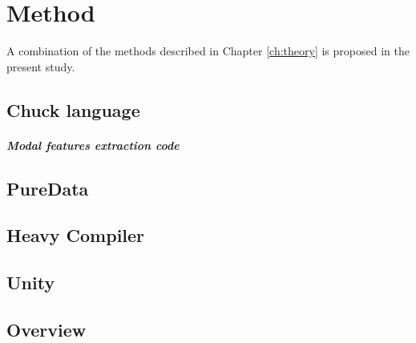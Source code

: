 \chapter{Method}\label{ch:method}
\mbox{}\par
A combination of the methods described in Chapter \ref{ch:theory} is proposed in the present
study.


\section{Chuck language}
\mbox{}\par

\paragraph{Modal features extraction code}
\mbox{}\par

\section{PureData}

\section{Heavy Compiler}

\section{Unity}

\section{Overview}